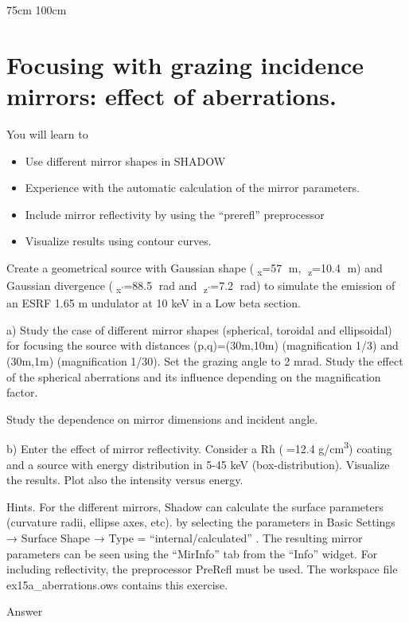 \documentclass[]{article}
\providecommand{\tightlist}{%
  \setlength{\itemsep}{0pt}\setlength{\parskip}{0pt}}
\begin{document}
75cm 100cm

\section{Focusing with grazing incidence mirrors: effect of
aberrations.}\label{focusing-with-grazing-incidence-mirrors-effect-of-aberrations.}

You will learn to

\begin{itemize}
\tightlist
\item
  Use different mirror shapes in SHADOW
\item
  Experience with the automatic calculation of the mirror parameters.
\item
  Include mirror reflectivity by using the ``prerefl'' preprocessor
\item
  Visualize results using contour curves.
\end{itemize}

Create a geometrical source with Gaussian shape (\textsubscript{x}=57
m, \textsubscript{z}=10.4 m) and Gaussian divergence
(\textsubscript{x'}=88.5 rad and \textsubscript{z'}=7.2 rad) to
simulate the emission of an ESRF 1.65 m undulator at 10 keV in a Low
beta section.

a) Study the case of different mirror shapes (spherical, toroidal and
ellipsoidal) for focusing the source with distances (p,q)=(30m,10m)
(magnification 1/3) and (30m,1m) (magnification 1/30). Set the grazing
angle to 2 mrad. Study the effect of the spherical aberrations and its
influence depending on the magnification factor.

Study the dependence on mirror dimensions and incident angle.

b) Enter the effect of mirror reflectivity. Consider a Rh (=12.4
g/cm\textsuperscript{3}) coating and a source with energy distribution
in 5-45 keV (box-distribution). Visualize the results. Plot also the
intensity versus energy.

Hints. For the different mirrors, Shadow can calculate the surface
parameters (curvature radii, ellipse axes, etc). by selecting the
parameters in Basic Settings → Surface Shape → Type =
``internal/calculated'' . The resulting mirror parameters can be seen
using the ``MirInfo'' tab from the ``Info'' widget. For including
reflectivity, the preprocessor PreRefl must be used. The workspace file
ex15a\_aberrations.ows contains this exercise.

Answer
\end{document}
